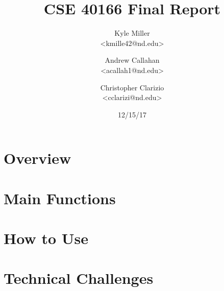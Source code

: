 \documentclass[letterpaper]{article}
\begin{document}

\title{CSE 40166 Final Report}
\date{12/15/17}
\author{Kyle Miller\\ {\textless}kmille42@nd.edu{\textgreater} \and Andrew Callahan\\ {\textless}acallah1@nd.edu{\textgreater} \and Christopher Clarizio\\ {\textless}cclarizi@nd.edu{\textgreater}}

\maketitle


\section*{Overview}

\paragraph{}

\section*{Main Functions}

\paragraph{}



\section*{How to Use}

\paragraph{}



\section*{Technical Challenges}
\end{document}
